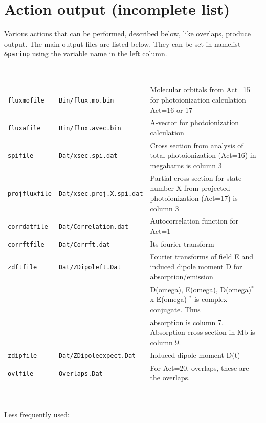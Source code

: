 \documentclass[10pt,leqno, oneside]{book}
\begin{document}
\section{Action output (incomplete list)}

Various actions that can be performed, described below, like overlaps, produce output.  The main output files are listed below.
They can be set in namelist \verb#&parinp# using the variable name in the left column.

\

{\small
\begin{tabular}{lll}
\verb#fluxmofile# & \verb#Bin/flux.mo.bin# & Molecular orbitals from Act=15 for photoionization calculation Act=16 or 17\\
\verb#fluxafile# & \verb#Bin/flux.avec.bin# & A-vector for photoionization calculation\\
\verb#spifile# & \verb#Dat/xsec.spi.dat# & Cross section from analysis of total photoionization (Act=16) in megabarns is column 3 \\
\verb#projfluxfile# & \verb#Dat/xsec.proj.X.spi.dat# & Partial cross section for state number X from projected photoionization (Act=17) is column 3 \\
\verb#corrdatfile# &\verb#Dat/Correlation.dat# & Autocorrelation function for Act=1  \\
\verb#corrftfile# & \verb#Dat/Corrft.dat# & Its fourier transform  \\
\verb#zdftfile# & \verb#Dat/ZDipoleft.Dat# & Fourier transforms of field E and induced dipole moment D for absorption/emission \\
&	& D(omega), E(omega), D(omega)$^*$ x E(omega)     $^*$ is complex conjugate.   Thus  \\
&	& absorption is column 7.  Absorption cross section in Mb is column 9. \\
\verb#zdipfile# & \verb#Dat/ZDipoleexpect.Dat#  & Induced dipole moment D(t) \\
\verb#ovlfile# & \verb#Overlaps.Dat#  & For Act=20, overlaps, these are the overlaps. \\
\end{tabular}
}

\

Less frequently used: 
\end{document}
